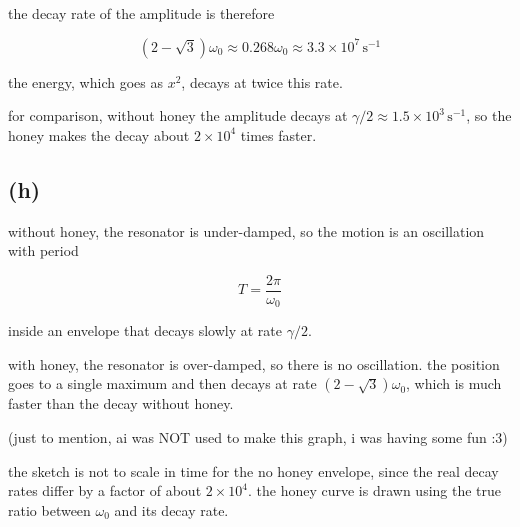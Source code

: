 \documentclass{article}
\begin{document}
the decay rate of the amplitude is therefore

\[
\boxed{(2-\sqrt{3})\omega_0\approx0.268\omega_0\approx3.3\times10^{7}\,\mathrm{s^{-1}}}
\]

the energy, which goes as $x^2$, decays at twice this rate.

for comparison, without honey the amplitude decays at $\gamma/2\approx1.5\times10^{3}\,\mathrm{s^{-1}}$, so the honey makes the decay about $2\times10^{4}$ times faster.

\subsection*{(h)}

without honey, the resonator is under-damped, so the motion is an oscillation with period

\[
T=\frac{2\pi}{\omega_0}
\]

inside an envelope that decays slowly at rate $\gamma/2$.

with honey, the resonator is over-damped, so there is no oscillation. the position goes to a single maximum and then decays at rate $(2-\sqrt{3})\omega_0$, which is much faster than the decay without honey.

\bigskip
(just to mention, ai was NOT used to make this graph, i was having some fun :3)

\begin{center}
\end{center}

the sketch is not to scale in time for the no honey envelope, since the real decay rates differ by a factor of about $2\times10^{4}$. the honey curve is drawn using the true ratio between $\omega_0$ and its decay rate.
\end{document}
